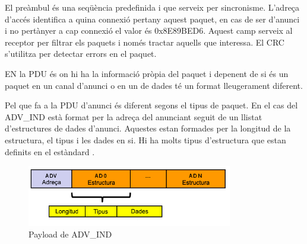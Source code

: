 El preàmbul és una seqüència predefinida i que serveix per sincronisme.
L'adreça d'accés identifica a quina connexió pertany aquest paquet, en cas de ser d'anunci i no pertànyer a cap connexió el valor és 0x8E89BED6.
Aquest camp serveix al receptor per filtrar els paquets i només tractar aquells que interessa.
El CRC s'utilitza per detectar errors en el paquet. 

EN la PDU és on hi ha la informació pròpia del paquet i depenent de si és un paquet en un canal d'anunci o en un de dades té un format lleugerament diferent.

\begin{figure}[!h]
	\begin{center}
		\begin{subfigmatrix}{1}
		\end{subfigmatrix}
	\end{center}
\end{figure}

Pel que fa a la PDU d'anunci és diferent segons el tipus de paquet.
En el cas del ADV\_IND està format per la adreça del anunciant seguit de un llistat d'estructures de dades d'anunci.
Aquestes estan formades per la longitud de la estructura, el tipus i les dades en si.
Hi ha molts tipus d'estructura que estan definits en el estàndard \cite{AD_Types}.

\begin{figure}[!h]
	\begin{center}
		\includegraphics[width=0.8\textwidth]{./images/adv-ind-packet.png}
		\caption{Payload de ADV\_IND}
	\end{center}
\end{figure}

